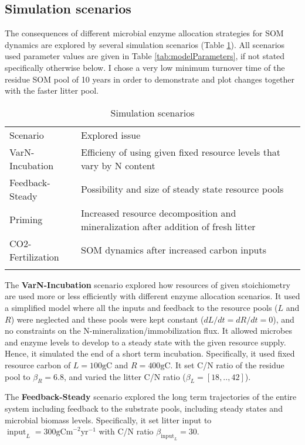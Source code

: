 \subsection{ Simulation scenarios 
\label{sec:SimScen}}

The consequences of different microbial enzyme allocation strategies for SOM
dynamics are explored by several simulation scenarios (Table \ref{tab:SimScen}). 
All scenarios used parameter values are given in Table \ref{tab:modelParameters}, if not
stated specifically otherwise below. I chose a very low minimum turnover time
of the residue SOM pool of 10 years in order to demonstrate and plot changes together
with the faster litter pool.

\begin{table}[t]
\caption{Simulation scenarios \label{tab:SimScen}}
\vskip4mm
\centering
\begin{tabular}{lp{5.3cm}}
\tophline
Scenario & Explored issue\\
\middlehline
VarN-Incubation & Efficieny of using given fixed resource levels that
vary by N content \\
Feedback-Steady & Possibility and size of steady state resource pools\\
Priming & Increased resource decomposition and mineralization after
addition of fresh litter\\
CO2-Fertilization & SOM dynamics after increased carbon inputs\\
\bottomhline
\end{tabular}
\end{table}

The \textbf{VarN-Incubation} scenario explored how resources of given
stoichiometry are used more or less efficiently with different enzyme allocation
scenarios. It used a simplified model where all the inputs and feedback to the
resource pools ($L$ and $R$) were neglected and these pools were kept constant
($dL/dt = dR/dt = 0$), and no constraints on the N-mineralization/immobilization
flux. It allowed microbes and enzyme levels to develop to a steady
state with the given resource supply. Hence, it simulated the end of a short term
incubation. Specifically, it used fixed resource carbon of $L=100\mathrm{gC}$
and $R=400\mathrm{gC}$. It set C/N ratio of the residue pool to $\beta_R=6.8$,
and varied the litter C/N ratio ($\beta_L = [18,..,42]$).

The \textbf{Feedback-Steady} scenario explored the long term trajectories of the
entire system including feedback to the substrate pools, including steady states
and microbial biomass levels. Specifically, it set litter input to
$\operatorname{input}_L = 300\mathrm{gCm}^{-2}\mathrm{yr}^{-1}$ with C/N ratio
$\beta_{\operatorname{input}_L} = 30$.

